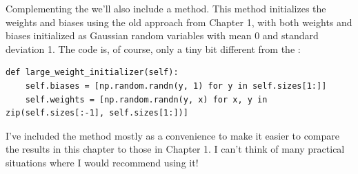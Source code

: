 \documentclass[a4paper,twoside,10pt]{book}
\begin{document}
Complementing the  we'll also include a  method. This method initializes the weights and biases using the old approach from Chapter 1, with both weights and biases initialized as Gaussian random variables with mean 0 and standard deviation 1. The code is, of course, only a tiny bit different from the :
\begin{lstlisting}
def large_weight_initializer(self):
	self.biases = [np.random.randn(y, 1) for y in self.sizes[1:]]
	self.weights = [np.random.randn(y, x) for x, y in zip(self.sizes[:-1], self.sizes[1:])]
\end{lstlisting}
	
I've included the  method mostly as a convenience to make it easier to compare the results in this chapter to those in Chapter 1. I can't think of many practical situations where I would recommend using it!
\end{document}
